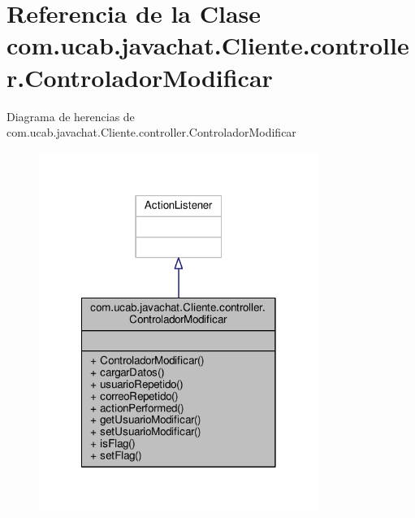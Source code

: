 \hypertarget{classcom_1_1ucab_1_1javachat_1_1_cliente_1_1controller_1_1_controlador_modificar}{\section{Referencia de la Clase com.\-ucab.\-javachat.\-Cliente.\-controller.\-Controlador\-Modificar}
\label{classcom_1_1ucab_1_1javachat_1_1_cliente_1_1controller_1_1_controlador_modificar}
}


Diagrama de herencias de com.\-ucab.\-javachat.\-Cliente.\-controller.\-Controlador\-Modificar
\nopagebreak
\begin{figure}[H]
\begin{center}
\leavevmode
\includegraphics[width=258pt]{d7/dcb/classcom_1_1ucab_1_1javachat_1_1_cliente_1_1controller_1_1_controlador_modificar__inherit__graph}
\end{center}
\end{figure}


